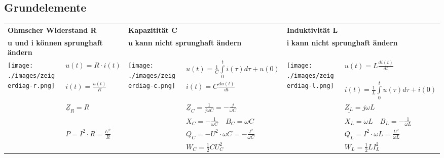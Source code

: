 \renewcommand{\arraystretch}{1.5}
\subsection{Grundelemente}
\begin{tabular}{p{1.5cm} p{4.3cm} |p{1.5cm} p{4.3cm}| p{1.5cm} p{4.3cm}}
	\multicolumn{2}{l}{\textbf{Ohmscher Widerstand R}}
	& \multicolumn{2}{l}{\textbf{Kapazitität C}}
	& \multicolumn{2}{l}{\textbf{Induktivität L}} \\
	\multicolumn{2}{l}{\textbf{u und i können sprunghaft ändern}}
	& \multicolumn{2}{l}{$\mathbf{u}$ \textbf{kann nicht sprunghaft ändern}}
	& \multicolumn{2}{l}{$\mathbf{i}$ \textbf{kann nicht sprunghaft ändern}} \\
	
	\multirow{2}{1.5cm}{
		\texttt{[image: ./images/zeigerdiag-r.png]}}
	& $u(t) = R \cdot i(t)$ 
	& \multirow{2}{1.5cm}{\texttt{[image: ./images/zeigerdiag-c.png]}}
	& $u(t) = \frac{1}{C} \int\limits_0^t i(\tau) d\tau + u(0)$
	& 
	\multirow{2}{1.5cm}{\texttt{[image: ./images/zeigerdiag-l.png]}}
	&$u(t) = L \frac{di(t)}{dt}$\\
	
	&$i(t) = \frac{u(t)}{R}$
	& & $i(t) = C \frac{d u(t)}{dt}$
	& & $i(t) = \frac{1}{L} \int\limits_0^t u(\tau) d\tau + i(0)$\\
	
	& $\underline{Z}_R = R$
	& & $\underline{Z}_C = \frac{1}{j \omega C} = - \frac{j}{\omega C}$
	& & $\underline{Z_L} = j \omega L$\\
	
	& 
	& & $X_C = -\frac{1}{\omega C} \quad B_C = \omega C$
	& & $X_L = \omega L
	\quad B_L = -\frac{1}{\omega L}$ \\
	
	& $P=I^2 \cdot R = \frac{U^2}{R}$
	& & $Q_C= - U^2 \cdot \omega C = - \frac{I^2}{\omega C}$
	& & $Q_L= I^2 \cdot \omega L = \frac{U^2}{\omega L}$\\
	
	& & & $W_C=\frac12 C U_C^2$
	& &$W_L=\frac12 L I_L^2$
\end{tabular}

